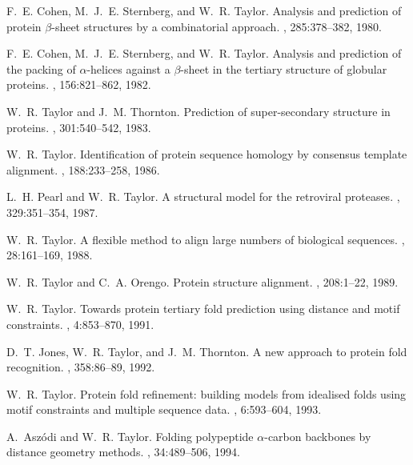 \begin{thebibliography}{100}

F.~E. Cohen, M.~J.~E. Sternberg, and W.~R. Taylor.
\newblock Analysis and prediction of protein $\beta$-sheet structures by a
  combinatorial approach.
, 285:378--382, 1980.

F.~E. Cohen, M.~J.~E. Sternberg, and W.~R. Taylor.
\newblock Analysis and prediction of the packing of $\alpha$-helices against a
  $\beta$-sheet in the tertiary structure of globular proteins.
, 156:821--862, 1982.

W.~R. Taylor and J.~M. Thornton.
\newblock Prediction of super-secondary structure in proteins.
, 301:540--542, 1983.

W.~R. Taylor.
\newblock Identification of protein sequence homology by consensus template
  alignment.
, 188:233--258, 1986.

L.~H. Pearl and W.~R. Taylor.
\newblock A structural model for the retroviral proteases.
, 329:351--354, 1987.

W.~R. Taylor.
\newblock A flexible method to align large numbers of biological sequences.
, 28:161--169, 1988.

W.~R. Taylor and C.~A. Orengo.
\newblock Protein structure alignment.
, 208:1--22, 1989.

W.~R. Taylor.
\newblock Towards protein tertiary fold prediction using distance and motif
  constraints.
, 4:853--870, 1991.

D.~T. Jones, W.~R. Taylor, and J.~M. Thornton.
\newblock A new approach to protein fold recognition.
, 358:86--89, 1992.

W.~R. Taylor.
\newblock Protein fold refinement: building models from idealised folds using
  motif constraints and multiple sequence data.
, 6:593--604, 1993.

A.~Asz\'{o}di and W.~R. Taylor.
\newblock Folding polypeptide $\alpha$-carbon backbones by distance geometry
  methods.
, 34:489--506, 1994.


\end{thebibliography}
